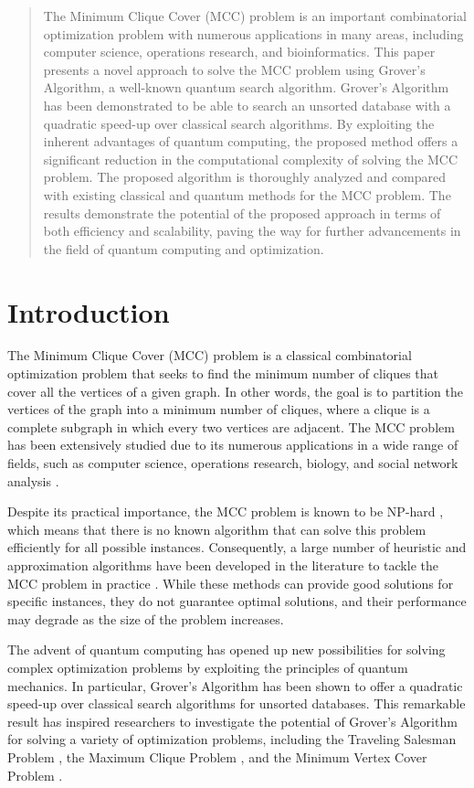 \begin{abstract}
The Minimum Clique Cover (MCC) problem is an important combinatorial optimization problem with numerous applications in many areas, including computer science, operations research, and bioinformatics. This paper presents a novel approach to solve the MCC problem using Grover's Algorithm, a well-known quantum search algorithm. Grover's Algorithm has been demonstrated to be able to search an unsorted database with a quadratic speed-up over classical search algorithms. By exploiting the inherent advantages of quantum computing, the proposed method offers a significant reduction in the computational complexity of solving the MCC problem. The proposed algorithm is thoroughly analyzed and compared with existing classical and quantum methods for the MCC problem. The results demonstrate the potential of the proposed approach in terms of both efficiency and scalability, paving the way for further advancements in the field of quantum computing and optimization.
\end{abstract}

\section{Introduction}

The Minimum Clique Cover (MCC) problem is a classical combinatorial optimization problem that seeks to find the minimum number of cliques that cover all the vertices of a given graph. In other words, the goal is to partition the vertices of the graph into a minimum number of cliques, where a clique is a complete subgraph in which every two vertices are adjacent. The MCC problem has been extensively studied due to its numerous applications in a wide range of fields, such as computer science, operations research, biology, and social network analysis \cite{mcc_applications}.

Despite its practical importance, the MCC problem is known to be NP-hard \cite{np_hard}, which means that there is no known algorithm that can solve this problem efficiently for all possible instances. Consequently, a large number of heuristic and approximation algorithms have been developed in the literature to tackle the MCC problem in practice \cite{mcc_heuristics}. While these methods can provide good solutions for specific instances, they do not guarantee optimal solutions, and their performance may degrade as the size of the problem increases.

The advent of quantum computing has opened up new possibilities for solving complex optimization problems by exploiting the principles of quantum mechanics. In particular, Grover's Algorithm \cite{grover1996} has been shown to offer a quadratic speed-up over classical search algorithms for unsorted databases. This remarkable result has inspired researchers to investigate the potential of Grover's Algorithm for solving a variety of optimization problems, including the Traveling Salesman Problem \cite{grover_tsp}, the Maximum Clique Problem \cite{grover_maxclique}, and the Minimum Vertex Cover Problem \cite{grover_mvc}.

